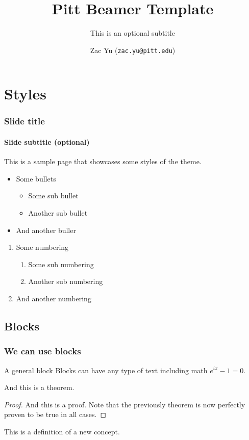 \documentclass{beamer}
\title{Pitt Beamer Template}
\subtitle{This is an optional subtitle}
\author[Zac Yu]{Zac Yu (\texttt{zac.yu@pitt.edu})}
\institute{Carnegie Mellon University}
\begin{document}
\maketitle

\section{Styles}

\begin{frame}
	\frametitle{Slide title}
	\framesubtitle{Slide subtitle (optional)}

	This is a sample page that showcases some styles of the theme.\break
	
	\begin{itemize}
		\item Some bullets
		\begin{itemize}
			\item Some sub bullet
			\item Another sub bullet
		\end{itemize}
		\item And another buller
	\end{itemize}

	\begin{enumerate}
		\item Some numbering
		\begin{enumerate}
			\item Some sub numbering
			\item Another sub numbering
		\end{enumerate}
		\item And another numbering
	\end{enumerate}
\end{frame}

\subsection{Blocks}

\begin{frame}
	\frametitle{We can use blocks}

	\begin{block}{A general block}
		Blocks can have any type of text including math $e^{i\pi}-1=0$.
	\end{block}

	\begin{theorem}
		And this is a theorem.
	\end{theorem}

	\begin{proof}
		And this is a proof. Note that the previously theorem is now perfectly proven to be true in all cases.
	\end{proof}

	\begin{definition}
		This is a definition of a new concept.
	\end{definition}
\end{frame}
\end{document}
